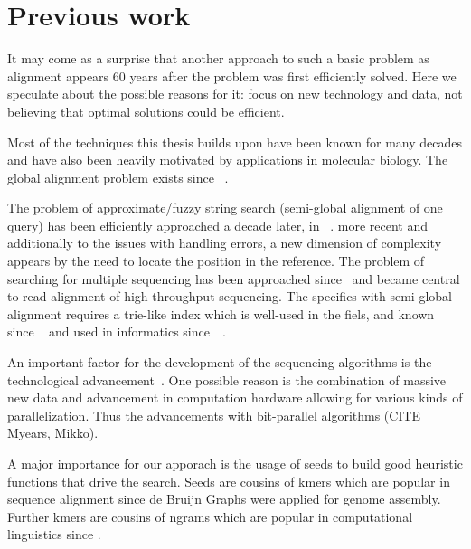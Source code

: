 \section{Previous work}

It may come as a surprise that another approach to such a basic problem as
alignment appears 60 years after the problem was first efficiently solved. Here
we speculate about the possible reasons for it: focus on new technology and
data, not believing that optimal solutions could be efficient.


Most of the techniques this thesis builds upon have been known for many decades
and have also been heavily motivated by applications in molecular biology. The
global alignment problem exists since
\citeyear{vintsyuk1968speech}~\cite{vintsyuk1968speech,needleman1970general}.

The problem of approximate/fuzzy string search (semi-global alignment of one
query) has been efficiently approached a decade later, in
\citeyear{sellers1980theory}~\cite{sellers1980theory,smith1981identification}.
more recent and additionally to the issues with handling errors, a new dimension
of complexity appears by the need to locate the position in the reference. The
problem of searching for multiple sequencing has been approached
since\citeyear{pearson1988improved}~\cite{pearson1988improved} and became
central to read alignment of high-throughput sequencing. The specifics with
semi-global alignment requires a trie-like index which is well-used in the
fiels, and known since
\citeyear{thue1912gegenseitige}~\cite{thue1912gegenseitige} and used in
informatics since~\citeyear{de1959file}~\cite{de1959file}.

An important factor for the development of the sequencing algorithms is the
technological advancement~\cite{alser2021technology}. One possible reason is the
combination of massive new data and advancement in computation hardware allowing
for various kinds of parallelization. Thus the advancements with bit-parallel
algorithms (CITE Myears, Mikko).

A major importance for our apporach is the usage of seeds to build good
heuristic functions that drive the \A search. Seeds are cousins of kmers which
are popular in sequence alignment since de Bruijn Graphs were applied for genome
assembly. Further kmers are cousins of ngrams which are popular in computational
linguistics since .


